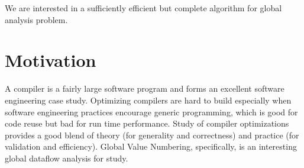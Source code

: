 We are interested in a sufficiently efficient but complete algorithm for global analysis problem.

\section{Motivation}
A compiler is a fairly large software program and forms an excellent software engineering case study. Optimizing compilers are hard to build especially when software engineering practices encourage generic programming, which is good for code reuse but bad for run time performance. Study of compiler optimizations provides a good blend of theory (for generality and correctness) and practice (for validation and efficiency). Global Value Numbering, specifically, is an interesting global dataflow analysis for study.
